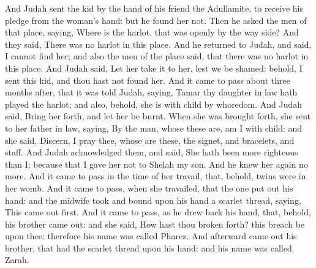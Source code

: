 \begin{biblechapter}
\verse And Judah sent the kid by the hand of his friend the Adullamite, to receive his pledge from the woman's hand: but he found her not.
\verse Then he asked the men of that place, saying, Where is the harlot, that was openly by the way side? And they said, There was no harlot in this place.
\verse And he returned to Judah, and said, I cannot find her; and also the men of the place said, that there was no harlot in this place.
\verse And Judah said, Let her take it to her, lest we be shamed: behold, I sent this kid, and thou hast not found her.
\verse And it came to pass about three months after, that it was told Judah, saying, Tamar thy daughter in law hath played the harlot; and also, behold, she is with child by whoredom. And Judah said, Bring her forth, and let her be burnt.
\verse When she was brought forth, she sent to her father in law, saying, By the man, whose these are, am I with child: and she said, Discern, I pray thee, whose are these, the signet, and bracelets, and staff.
\verse And Judah acknowledged them, and said, She hath been more righteous than I; because that I gave her not to Shelah my son. And he knew her again no more.
\verse And it came to pass in the time of her travail, that, behold, twins were in her womb.
\verse And it came to pass, when she travailed, that the one put out his hand: and the midwife took and bound upon his hand a scarlet thread, saying, This came out first.
\verse And it came to pass, as he drew back his hand, that, behold, his brother came out: and she said, How hast thou broken forth? this breach be upon thee: therefore his name was called Pharez.
\verse And afterward came out his brother, that had the scarlet thread upon his hand: and his name was called Zarah.
\end{biblechapter}

